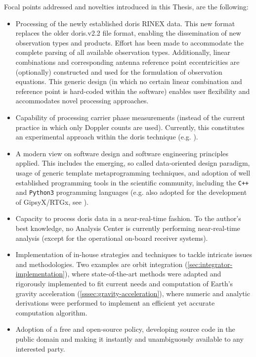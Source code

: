 Focal points addressed and novelties introduced in this Thesis, are the following:
\begin{itemize}
  \item Processing of the newly established \gls{doris} RINEX data. This new 
   format replaces the older doris.v2.2 file format, enabling the dissemination 
   of new observation types and products. Effort has been made to accommodate 
   the complete parsing of all available observation types. Additionally, linear
  combinations and corresponding antenna reference point eccentricities are 
  (optionally) constructed and used for the formulation of observation equations. 
  This generic design (in which no certain linear combination and reference point 
  is hard-coded within the software) enables user flexibility and accommodates 
  novel processing approaches.
  \item Capability of processing carrier phase measurements (instead of the current 
  practice in which only Doppler counts are used). Currently, this constitutes an 
  experimental approach within the \gls{doris} technique (e.g. \cite{Mercier2010}).
  \item A modern view on software design and software engineering principles applied. 
  This includes the emerging, so called data-oriented design paradigm, usage of 
  generic template metaprogramming techniques, and adoption of well established 
  programming tools in the scientific community, including the \texttt{C++} and 
  \texttt{Python3} programming languages (e.g. also adopted for the development 
  of GipsyX/RTGx, see \cite{Bertiger2020}).
  \item Capacity to process \gls{doris} data in a near-real-time fashion. To the 
  author's best knowledge, no Analysis Center is currently performing near-real-time 
  analysis (except for the operational on-board receiver systems).
  \item Implementation of in-house strategies and techniques to tackle intricate issues and methodologies.
  Two examples are orbit integration (\autoref{sec:integrator-implementation}), 
  where state-of-the-art methods were adapted and rigorously implemented to fit 
  current needs and computation of Earth's gravity acceleration 
  (\autoref{sssec:gravity-acceleration}), where numeric and analytic derivations were 
  performed to implement an efficient yet accurate computation algorithm.
  \item Adoption of a free and open-source policy, developing source code in the 
  public domain and making it instantly and unambiguously available to any interested 
  party.
\end{itemize}

